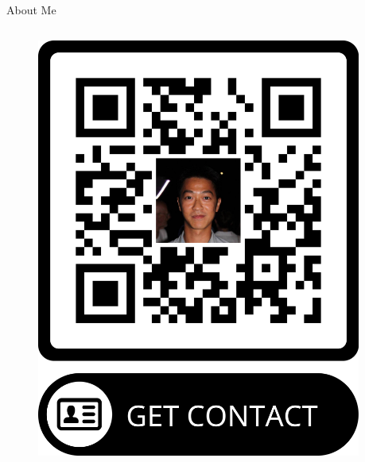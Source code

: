 \documentclass[final,hyperref={pdfpagelabels=false}]{beamer}
\begin{document}
\begin{frame}[t]
\begin{columns}[t]
\begin{column}{.465\textwidth}
\begin{block}{About Me}
\begin{columns}
\begin{column}{.35\textwidth} %
\centering
\begin{figure}
\includegraphics[width=0.95\linewidth]{figures/qr_Karel_Ha.png}
\end{figure}
\end{column}

\end{columns}

\end{block}


\end{column} %

\begin{column}{.015\textwidth}\end{column} %

\end{columns} %

\end{frame} %
\end{document}
